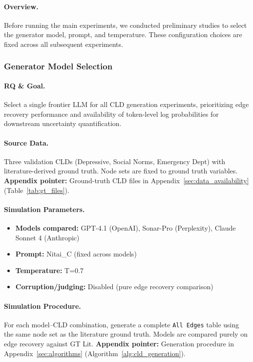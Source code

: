 \paragraph{Overview.}
Before running the main experiments, we conducted preliminary studies to select the generator model, prompt, and temperature. These configuration choices are fixed across all subsequent experiments.

\subsubsection{Generator Model Selection}

\paragraph{RQ \& Goal.}
Select a single frontier LLM for all CLD generation experiments, prioritizing edge recovery performance and availability of token-level log probabilities for downstream uncertainty quantification.

\paragraph{Source Data.}
Three validation CLDs (Depressive, Social Norms, Emergency Dept) with literature-derived ground truth. Node sets are fixed to ground truth variables.
\textbf{Appendix pointer:} Ground-truth CLD files in Appendix~\ref{sec:data_availability} (Table~\ref{tab:gt_files}).

\paragraph{Simulation Parameters.}
\begin{itemize}[noitemsep]
    \item \textbf{Models compared:} GPT-4.1 (OpenAI), Sonar-Pro (Perplexity), Claude Sonnet 4 (Anthropic)
    \item \textbf{Prompt:} Nitai\_C (fixed across models)
    \item \textbf{Temperature:} T=0.7
    \item \textbf{Corruption/judging:} Disabled (pure edge recovery comparison)
\end{itemize}

\paragraph{Simulation Procedure.}
For each model--CLD combination, generate a complete \texttt{All Edges} table using the same node set as the literature ground truth. Models are compared purely on edge recovery against GT Lit.
\textbf{Appendix pointer:} Generation procedure in Appendix~\ref{sec:algorithms} (Algorithm~\ref{alg:cld_generation}).


